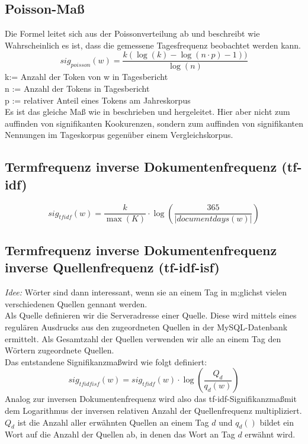 \subsection{Poisson-Maß}

Die Formel leitet sich aus der Poissonverteilung ab und beschreibt wie Wahrscheinlich es ist, dass die gemessene Tagesfrequenz beobachtet werden kann. 
\begin{equation}
sig_{poisson}(w) = \frac{k(\log(k)-\log(n\cdot p) -1 ))}{\log(n)}
\end{equation}
k:= Anzahl der Token von w in Tagesbericht\\
n := Anzahl der Tokens in Tagesbericht\\
p := relativer Anteil eines Tokens am Jahreskorpus\\
Es ist das gleiche Maß wie in \cite[S. 338-340]{heyer06} beschrieben und hergeleitet. Hier aber nicht zum auffinden von signifikanten Kookurenzen, sondern zum auffinden von signifikanten Nennungen im Tageskorpus gegenüber einem Vergleichskorpus.\\

\subsection{Termfrequenz inverse Dokumentenfrequenz (tf-idf)}
 \begin{equation}
sig_{tf idf}(w) = \frac{k}{\max(K)} \cdot \log ( \frac{365}{|documentdays(w)|})
\end{equation}

\subsection{Termfrequenz inverse Dokumentenfrequenz inverse Quellenfrequenz (tf-idf-isf)}
\emph{Idee: } W\"orter sind dann interessant, wenn sie an einem Tag in m;glichst vielen verschiedenen Quellen gennant werden.\\
Als Quelle definieren wir die Serveradresse einer Quelle. Diese wird mittels eines regul\"aren Ausdrucks aus den zugeordneten Quellen in der MySQL-Datenbank ermittelt. Als Gesamtzahl der Quellen verwenden wir alle an einem Tag den W\"ortern zugeordnete Quellen.\\
Das entstandene Signifikanzma\ss wird wie folgt definiert:
 \begin{equation}
sig_{tf idf isf}(w) = sig_{tf idf}(w) \cdot \log ( \frac{Q_d}{q_d(w)})
\end{equation}
Analog zur inversen Dokumentenfrequenz wird also das tf-idf-Signifikanzma\ss  mit dem Logarithmus der inversen relativen Anzahl der Quellenfrequenz multipliziert. $Q_d$ ist die Anzahl aller erw\"ahnten Quellen an einem Tag $d$ und $q_d()$ bildet ein Wort auf die Anzahl der Quellen ab, in denen das Wort an Tag $d$  erw\"ahnt wird. 



